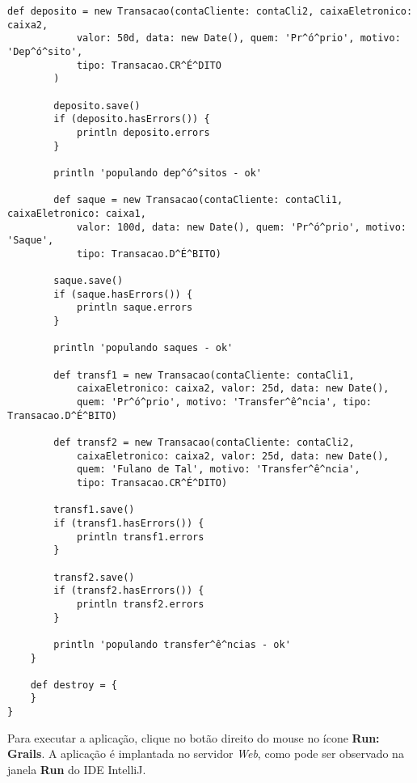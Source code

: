 \begin{lstlisting}[caption={\bf BootStrap.groovy (5)}, frame = trBL, float=htbp,
    label=codBootStrap25]
def deposito = new Transacao(contaCliente: contaCli2, caixaEletronico: caixa2,
            valor: 50d, data: new Date(), quem: 'Pr^ó^prio', motivo: 'Dep^ó^sito',
            tipo: Transacao.CR^É^DITO
        )
        
        deposito.save()
        if (deposito.hasErrors()) {
            println deposito.errors
        }
        
        println 'populando dep^ó^sitos - ok'
        
        def saque = new Transacao(contaCliente: contaCli1, caixaEletronico: caixa1, 
            valor: 100d, data: new Date(), quem: 'Pr^ó^prio', motivo: 'Saque', 
            tipo: Transacao.D^É^BITO)
        
        saque.save()
        if (saque.hasErrors()) {
            println saque.errors
        }
        
        println 'populando saques - ok'
        
        def transf1 = new Transacao(contaCliente: contaCli1, 
            caixaEletronico: caixa2, valor: 25d, data: new Date(),
            quem: 'Pr^ó^prio', motivo: 'Transfer^ê^ncia', tipo: Transacao.D^É^BITO)
        
        def transf2 = new Transacao(contaCliente: contaCli2, 
            caixaEletronico: caixa2, valor: 25d, data: new Date(),
            quem: 'Fulano de Tal', motivo: 'Transfer^ê^ncia', 
            tipo: Transacao.CR^É^DITO)
        
        transf1.save()
        if (transf1.hasErrors()) {
            println transf1.errors
        }
        
        transf2.save()
        if (transf2.hasErrors()) {
            println transf2.errors
        }
        
        println 'populando transfer^ê^ncias - ok'
    }

    def destroy = {
    }
} 
\end{lstlisting}

Para executar a  aplicação, clique no botão direito do mouse  no ícone {\bf Run:
  Grails}.   A aplicação  é  implantada no  servidor  {\it Web},  como pode  ser
observado na janela {\bf Run} do IDE IntelliJ. 

\vspace{0.2cm}

